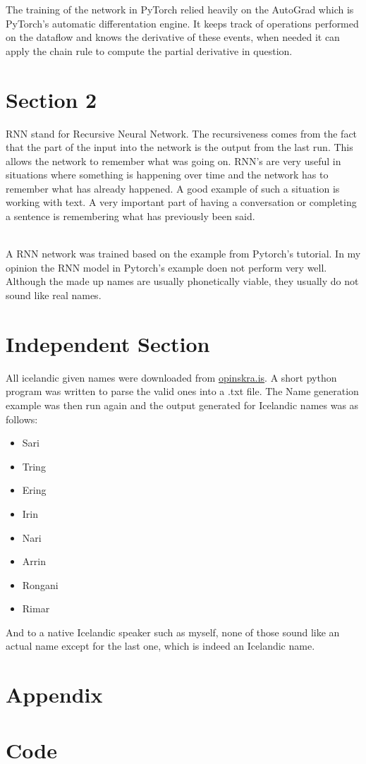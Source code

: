 \documentclass{article}
\begin{document}
The training of the network in PyTorch relied heavily on the AutoGrad which is PyTorch's automatic differentation engine. It keeps track of operations performed on the dataflow and knows the derivative of these events, when needed it can apply the chain rule to compute the partial derivative in question.

\section*{Section 2}
RNN stand for Recursive Neural Network. The recursiveness comes from the fact that the part of the input into the network is the output from the last run. This allows the network to remember what was going on. RNN's are very useful in situations where something is happening over time and the network has to remember what has already happened. A good example of such a situation is working with text. A very important part of having a conversation or completing a sentence is remembering what has previously been said.

\\
A RNN network was trained based on the example from Pytorch's tutorial. In my opinion the RNN model in Pytorch's example doen not perform very well. Although the made up names are usually phonetically viable, they usually do not sound like real names. 

\section*{Independent Section}
All icelandic given names were downloaded from \hyperlink{https://opingogn.is/dataset/mannanafnaskra/resource/27dc8c43-247e-4797-a603-87853637e038}{opinskra.is}. A short python program was written to parse the valid ones into a .txt file. The Name generation example was then run again and the output generated for Icelandic names was as follows:

\begin{itemize}
    \item Sari
    \item Tring
    \item Ering
    \item Irin
    \item Nari
    \item Arrin
    \item Rongani
    \item Rimar
\end{itemize}

And to a native Icelandic speaker such as myself, none of those sound like an actual name except for the last one, which is indeed an Icelandic name.

\newpage
\section*{Appendix}
\appendix
\section{Code}


\end{document}
